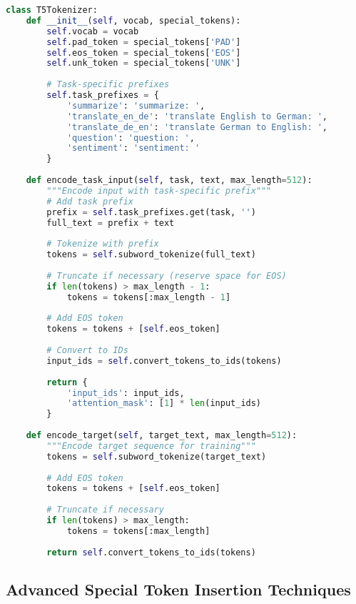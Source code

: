 \begin{lstlisting}[language=Python, caption=T5-style task prefix insertion]
class T5Tokenizer:
    def __init__(self, vocab, special_tokens):
        self.vocab = vocab
        self.pad_token = special_tokens['PAD']
        self.eos_token = special_tokens['EOS']
        self.unk_token = special_tokens['UNK']
        
        # Task-specific prefixes
        self.task_prefixes = {
            'summarize': 'summarize: ',
            'translate_en_de': 'translate English to German: ',
            'translate_de_en': 'translate German to English: ',
            'question': 'question: ',
            'sentiment': 'sentiment: '
        }
    
    def encode_task_input(self, task, text, max_length=512):
        """Encode input with task-specific prefix"""
        # Add task prefix
        prefix = self.task_prefixes.get(task, '')
        full_text = prefix + text
        
        # Tokenize with prefix
        tokens = self.subword_tokenize(full_text)
        
        # Truncate if necessary (reserve space for EOS)
        if len(tokens) > max_length - 1:
            tokens = tokens[:max_length - 1]
        
        # Add EOS token
        tokens = tokens + [self.eos_token]
        
        # Convert to IDs
        input_ids = self.convert_tokens_to_ids(tokens)
        
        return {
            'input_ids': input_ids,
            'attention_mask': [1] * len(input_ids)
        }
    
    def encode_target(self, target_text, max_length=512):
        """Encode target sequence for training"""
        tokens = self.subword_tokenize(target_text)
        
        # Add EOS token
        tokens = tokens + [self.eos_token]
        
        # Truncate if necessary
        if len(tokens) > max_length:
            tokens = tokens[:max_length]
            
        return self.convert_tokens_to_ids(tokens)
\end{lstlisting}

\subsection{Advanced Special Token Insertion Techniques}

